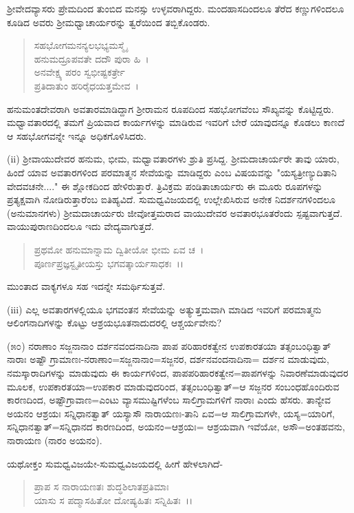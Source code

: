 ಶ‍್ರೀವೇದವ್ಯಾಸರು ಪ್ರೇಮದಿಂದ ತುಂಬಿದ ಮನಸ್ಸು ಉಳ್ಳವರಾಗಿದ್ದರು. ಮಂದಹಾಸದಿಂದಲೂ ತೆರೆದ ಕಣ್ಣುಗಳಿಂದಲೂ ಕೂಡಿದ ಅವರು ಶ‍್ರೀಮಧ್ವಾಚಾರ್ಯರನ್ನು ತ್ವರೆಯಿಂದ ತಬ್ಬಿಕೊಂಡರು.

\begin{verse}
ಸಹಭೋಗಮನನ್ಯಲಭಭ್ಯಮಸ್ಮೈ\\ ಹನುಮದ್ರೂಪವತೇ ದದೌ ಪುರಾ ಹಿ~।\\ ಅನವೇಕ್ಷ್ಯ ಪರಂ ಸ್ವಭೀಷ್ಟಕರ್ತ್ರೇ\\ ಪ್ರತಿದಾತುಂ ಹರಿರೈಧಯತ್ತಮೇವ~।
\end{verse}

ಹನುಮಂತದೇವರಾಗಿ ಅವತಾರಮಾಡಿದ್ದಾಗ ಶ‍್ರೀರಾಮನ ರೂಪದಿಂದ ಸಹಭೋಗವೆಂಬ ಸೌಖ್ಯವನ್ನು ಕೊಟ್ಟಿದ್ದರು. ಮಧ್ವಾವತಾರದಲ್ಲಿ ತಮಗೆ ಪ್ರಿಯವಾದ ಕಾರ್ಯಗಳನ್ನು ಮಾಡಿರುವ ಇವರಿಗೆ ಬೇರೆ ಯಾವುದನ್ನೂ ಕೊಡಲು ಕಾಣದೆ ಆ ಸಹಭೋಗವನ್ನೇ ಇನ್ನೂ ಅಧಿಕಗೊಳಿಸಿದರು.

(ii) ಶ‍್ರೀವಾಯುದೇವರ ಹನುಮ, ಭೀಮ, ಮಧ್ವಾವತಾರಗಳು ಶ್ರುತಿ ಪ್ರಸಿದ್ದ. ಶ‍್ರೀಮದಾಚಾರ್ಯರೇ ತಾವು ಯಾರು, ಹಿಂದೆ ಯಾವ ಅವತಾರಗಳಿಂದ ಪರಮಾತ್ಮನ ಸೇವೆಯನ್ನು ಮಾಡಿದ್ದರು ಎಂಬ ವಿಷಯವನ್ನು "ಯಸ್ಯತ್ರೀಣ್ಯುದಿತಾನಿ ವೇದವಚನೇ...." ಈ ಶ್ಲೋಕದಿಂದ ಹೇಳಿರುತ್ತಾರೆ. ತ್ರಿವಿಕ್ರಮ ಪಂಡಿತಾಚಾರ್ಯರು ಈ ಮೂರು ರೂಪಗಳನ್ನು ಪ್ರತ್ಯಕ್ಷವಾಗಿ ನೋಡಿರುತ್ತಾರೆಂಬ ಐತಿಹ್ಯವಿದೆ. ಸುಮಧ್ವವಿಜಯದಲ್ಲಿ ಉಲ್ಲೇಖಿಸಿರುವ ಅನೇಕ ನಿದರ್ಶನಗಳಿಂದಲೂ (ಅನುಮಾನಗಳು) ಶ‍್ರೀಮದಾಚಾರ್ಯರು ಜೀವೋತ್ತಮರಾದ ವಾಯುದೇವರ ಅವತಾರಭೂತರೆಂದು ಸ್ಪಷ್ಟವಾಗುತ್ತದೆ. ವಾಯುಪುರಾಣದಿಂದಲೂ ಇದು ವೇದ್ಯವಾಗುತ್ತದೆ.

\begin{verse}
 ಪ್ರಥಮೋ ಹನುಮಾನ್ನಾಮ ದ್ವಿತೀಯೋ ಭೀಮ ಏವ ಚ~।\\ ಪೂರ್ಣಪ್ರಜ್ಞಸ್ಟೃತೀಯಸ್ತು ಭಗವತ್ಕಾರ್ಯಸಾಧಕಃ~।।
\end{verse}

\noindent
ಮುಂತಾದ ವಾಕ್ಯಗಳೂ ಸಹ ಇದನ್ನೇ ಸಮರ್ಥಿಸುತ್ತವೆ.

(iii) ಎಲ್ಲ ಅವತಾರಗಳಲ್ಲಿಯೂ ಭಗವಂತನ ಸೇವೆಯನ್ನು ಅತ್ಯುತ್ತಮವಾಗಿ ಮಾಡಿದ ಇವರಿಗೆ ಪರಮಾತ್ಮನು ಆಲಿಂಗನಾದಿಗಳನ್ನು ಕೊಟ್ಟು ಆಶ್ರಯಭೂತನಾದುದರಲ್ಲಿ ಆಶ್ಚರ್ಯವೇನು?

(೫೦) ನರಾಣಾಂ ಸಜ್ಜನಾನಾಂ ದರ್ಶನವಂದನಾದಿನಾ ಪಾಪ ಪರಿಹಾರಕತ್ವೇನ ಉಪಕಾರತಯಾ ತತ್ಸಂಬಂಧಿತ್ವಾತ್ ನಾರಾಃ ಅಷ್ಟೌ ಗ್ರಾಮಾಣಃ-ನರಾಣಾಂ=ಸಜ್ಜನಾನಾಂ=ಸಜ್ಜನರ, ದರ್ಶನವಂದನಾದಿನಾ= ದರ್ಶನ ಮಾಡುವುದು, ನಮಸ್ಕಾರಾದಿಗಳನ್ನು ಮಾಡುವುದು ಈ ಕಾರ್ಯಗಳಿಂದ, ಪಾಪಪರಿಹಾರಕತ್ವೇನ=ಪಾಪಗಳನ್ನು ನಿವಾರಣೆಮಾಡುವುದರ ಮೂಲಕ, ಉಪಕಾರತಯಾ=ಉಪಕಾರ ಮಾಡುವುದರಿಂದ, ತತ್ಸಂಬಂಧಿತ್ವಾತ್=ಆ ಸಜ್ಜನರ ಸಂಬಂಧಹೊಂದಿರುವ ಕಾರಣದಿಂದ, ಅಷ್ಟೌಗ್ರಾವಾಣ=ಎಂಟು ವ್ಯಾಸಮುಷ್ಟಿಗಳೆಂಬ ಸಾಲಿಗ್ರಾಮಗಳಿಗೆ ನಾರಾಃ ಎಂದು ಹೆಸರು. ತಾನ್ಯೇವ ಅಯನಂ ಆಶ್ರಯಃ ಸನ್ನಿಧಾನತ್ವಾತ್ ಯಸ್ಯಾಸೌ ನಾರಾಯಣಃ-ತಾನಿ ಏವ=ಆ ಸಾಲಿಗ್ರಾಮಗಳೇ, ಯಸ್ಯ=ಯಾರಿಗೆ, ಸನ್ನಿಧಾನತ್ವಾತ್=ಸನ್ನಿಧಾನದ ಕಾರಣದಿಂದ, ಅಯನಂ=ಆಶ್ರಯಃ= ಆಶ್ರಯವಾಗಿ ಇವೆಯೋ, ಅಸೌ=ಅಂತಹವನು, ನಾರಾಯಣ (ನಾರಂ ಅಯನಂ).

ಯಥೋಕ್ತಂ ಸುಮಧ್ವವಿಜಯೇ-ಸುಮಧ್ವವಿಜಯದಲ್ಲಿ ಹೀಗೆ ಹೇಳಲಾಗಿದೆ-

\begin{verse}
ಪ್ರಾಪ ಸ ನಾರಾಯಣತಃ ಶುದ್ಧಶಿಲಾತಪ್ರತಿಮಾಃ \\ ಯಾಸು ಸ ಪದ್ಮಾಸಹಿತೋ ದೋಷ್ಯಹಿತಃ ಸನ್ನಿಹಿತಃ~।।
\end{verse}

